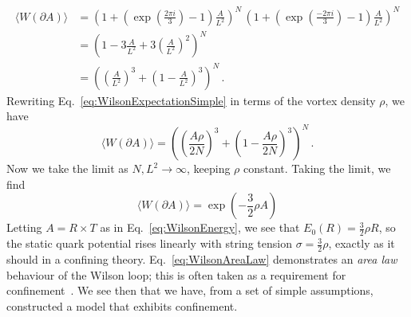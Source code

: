 %
\begin{align}
\langle W(\partial A)\rangle &=\left(1+\left(\exp\left(\frac{2\pi i}{3}\right) - 1\right)\frac{A}{L^2}\right)^N\, \left(1+\left(\exp\left(\frac{-2\pi i}{3}\right) - 1\right)\frac{A}{L^2}\right)^N\nonumber\\
&=\left(1 -3\frac{A}{L^2} + 3\left(\frac{A}{L^2}\right)^2\right)^N\nonumber\\
&= \left(\left(\frac{A}{L^2}\right)^3+\left(1-\frac{A}{L^2}\right)^3\right)^N\, .\label{eq:WilsonExpectationSimple}
\end{align}
%
Rewriting Eq.~\ref{eq:WilsonExpectationSimple} in terms of the vortex density $\rho$, we have
%
\begin{equation}
\langle W(\partial A)\rangle = \left(\left(\frac{A\rho}{2N}\right)^3+\left(1-\frac{A\rho}{2N}\right)^3\right)^N\, .
\end{equation}
%
Now we take the limit as $N,L^2\rightarrow\infty$, keeping $\rho$ constant. Taking the limit, we find
%
\begin{equation}
\langle W(\partial A)\rangle = \exp\left(-\frac{3}{2}\rho A\right)
\label{eq:WilsonAreaLaw}
\end{equation}
%
Letting $A=R\times T$ as in Eq.~\ref{eq:WilsonEnergy}, we see that $E_0(R) = \frac{3}{2}\rho R$, so the static quark potential rises linearly with string tension $\sigma = \frac{3}{2}\rho$, exactly as it should in a confining theory. Eq.~\ref{eq:WilsonAreaLaw} demonstrates an {\it area law} behaviour of the Wilson loop; this is often taken as a requirement for confinement~\cite{DelDebbio:1998luz,Dosch:1988ha}. We see then that we have, from a set of simple assumptions, constructed a model that exhibits confinement.\\

